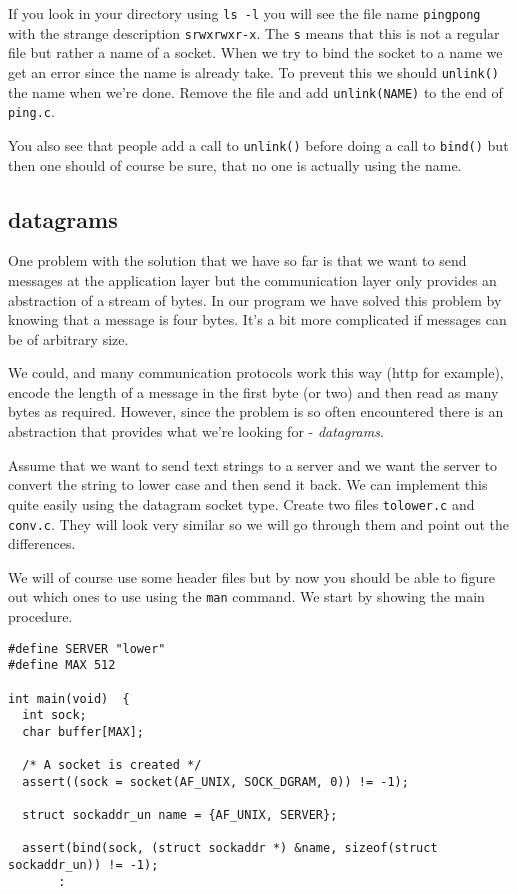 \documentclass[a4paper,11pt]{article}
\begin{document}
If you look in your directory using {\tt ls -l} you will see the file
name {\tt pingpong} with the strange description {\tt srwxrwxr-x}. The
{\tt s} means that this is not a regular file but rather a name of a
socket. When we try to bind the socket to a name we get an error since
the name is already take. To prevent this we should {\tt unlink()} the
name when we're done. Remove the file and add {\tt unlink(NAME)} to
the end of {\tt ping.c}. 

You also see that people add a call to {\tt unlink()} before doing a
call to {\tt bind()} but then one should of course be sure, that no one
is actually using the name.

\subsection{datagrams}

One problem with the solution that we have so far is that we want to
send messages at the application layer but the communication layer only
provides an abstraction of a stream of bytes. In our program we have
solved this problem by knowing that a message is four bytes. It's a
bit more complicated if messages can be of arbitrary size. 

We could, and many communication protocols work this way (http for
example), encode the length of a message in the first byte (or two) and
then read as many bytes as required. However, since the problem is so
often encountered there is an abstraction that provides what we're
looking for - {\em datagrams}.

Assume that we want to send text strings to a server and we want the
server to convert the string to lower case and then send it back. We
can implement this quite easily using the datagram socket type. Create
two files {\tt tolower.c} and {\tt conv.c}. They will look very similar
so we will go through them and point out the differences. 

We will of course use some header files but by now you should be able to
figure out which ones to use using the {\tt man} command. We start by
showing the main procedure.

\begin{lstlisting}
#define SERVER "lower"
#define MAX 512

int main(void)  {
  int sock;
  char buffer[MAX];

  /* A socket is created */
  assert((sock = socket(AF_UNIX, SOCK_DGRAM, 0)) != -1);

  struct sockaddr_un name = {AF_UNIX, SERVER};

  assert(bind(sock, (struct sockaddr *) &name, sizeof(struct sockaddr_un)) != -1);
       :  
\end{lstlisting}
\end{document}
